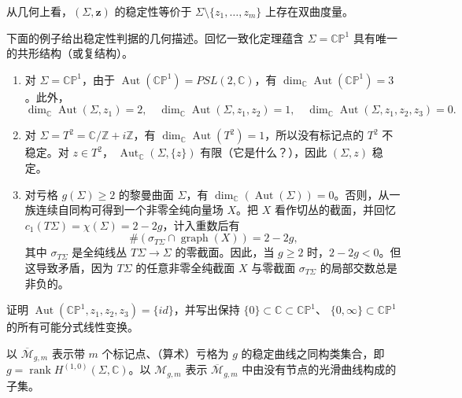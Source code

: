 从几何上看，$(\Sigma,\mathbf z)$ 的稳定性等价于
$\Sigma\setminus\{z_1,\ldots,z_m\}$ 上存在双曲度量。

下面的例子给出稳定性判据的几何描述。回忆一致化定理蕴含
$\Sigma=\mathbb{CP}^1$ 具有唯一的共形结构（或复结构）。

\begin{example}\label{ex:stability-automorphism-dimensions}
\begin{enumerate}[label=(\arabic*)]
 \item 对 $\Sigma=\mathbb{CP}^1$，由于
 $\operatorname{Aut}(\mathbb{CP}^1)=PSL(2,\mathbb C)$，有
 $\dim_{\mathbb C}\operatorname{Aut}(\mathbb{CP}^1)=3$。此外，
 \[
 \dim_{\mathbb C}\operatorname{Aut}(\Sigma,z_1)=2,
 \quad
 \dim_{\mathbb C}\operatorname{Aut}(\Sigma,z_1,z_2)=1,
 \quad
 \dim_{\mathbb C}\operatorname{Aut}(\Sigma,z_1,z_2,z_3)=0.
 \]
 \item 对 $\Sigma=T^2=\mathbb C/\mathbb Z+i\mathbb Z$，有
 $\dim_{\mathbb C}\operatorname{Aut}(T^2)=1$，所以没有标记点的
 $T^2$ 不稳定。对 $z\in T^2$，
 $\operatorname{Aut}_{\mathbb C}(\Sigma,\{z\})$ 有限（它是什么？），因此 $(\Sigma,z)$ 稳定。
 \item 对亏格 $g(\Sigma)\geq2$ 的黎曼曲面 $\Sigma$，有
 $\dim_{\mathbb C}(\operatorname{Aut}(\Sigma))=0$。否则，从一族连续自同构可得到一个非零全纯向量场 $X$。把 $X$ 看作切丛的截面，并回忆
 $c_1(T\Sigma)=\chi(\Sigma)=2-2g$，计入重数后有
 \[
  \#(\sigma_{T\Sigma}\cap\operatorname{graph}(X))=2-2g,
 \]
 其中 $\sigma_{T\Sigma}$ 是全纯线丛 $T\Sigma\to\Sigma$ 的零截面。因此，当 $g\geq2$ 时，$2-2g<0$。但这导致矛盾，因为 $T\Sigma$ 的任意非零全纯截面 $X$ 与零截面 $\sigma_{T\Sigma}$ 的局部交数总是非负的。
\end{enumerate}
\end{example}

\begin{exercise}\label{ex:automorphisms-three-points-mobius}
证明 $\operatorname{Aut}(\mathbb{CP}^1,z_1,z_2,z_3)=\{id\}$，并写出保持
$\{0\}\subset\mathbb C\subset\mathbb{CP}^1$、
$\{0,\infty\}\subset\mathbb{CP}^1$ 的所有可能分式线性变换。
\end{exercise}

\begin{definition}\label{def:deligne-mumford-stable-curves}
以 $\overline{\mathcal M}_{g,m}$ 表示带 $m$ 个标记点、（算术）亏格为 $g$ 的稳定曲线之同构类集合，即
$g=\operatorname{rank}H^{(1,0)}(\Sigma,\mathbb C)$。以
$\mathcal M_{g,m}$ 表示 $\overline{\mathcal M}_{g,m}$ 中由没有节点的光滑曲线构成的子集。
\end{definition}

